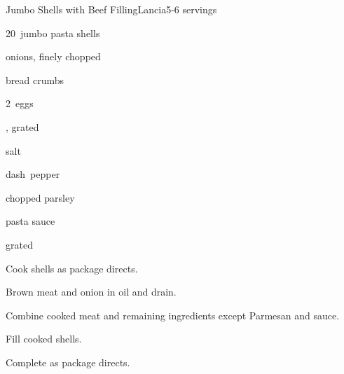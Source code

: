 \begin{recipe}{Jumbo Shells with Beef Filling}{Lancia}{5-6 servings}

\begin{ingredients}
\item 20~jumbo pasta shells
\item {} 
\item \C{\quarter} onions, finely chopped
\item \C{\quarter} bread crumbs
\item 2~eggs
\item {} , grated 
\item \tp{\half} salt
\item dash~pepper
\item {} chopped parsley
\item \C{3\half} pasta sauce
\item \C{\quarter} grated 
\end{ingredients}

\begin{directions}
\item Cook shells as package directs.
\item Brown meat and onion in oil and drain.
\item Combine cooked meat and remaining ingredients except Parmesan and sauce.
\item Fill cooked shells.
\item Complete as package directs.
\end{directions}

\end{recipe}
